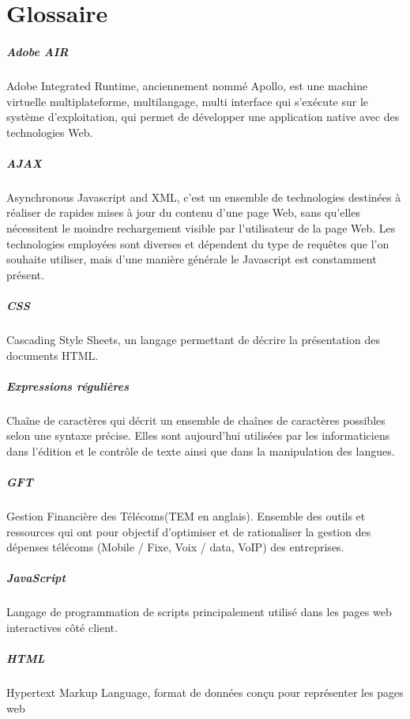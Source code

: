 \chapter{Glossaire}
\paragraph{Adobe AIR} Adobe Integrated Runtime, anciennement nommé Apollo, est une machine virtuelle multiplateforme, multilangage, multi interface qui s'exécute sur le système d'exploitation, qui permet de développer une application native avec des technologies Web.
\paragraph{AJAX}
Asynchronous Javascript and XML, c'est un ensemble de technologies destinées à réaliser de rapides mises à jour du contenu d'une page Web, sans qu'elles nécessitent le moindre rechargement visible par l'utilisateur de la page Web. Les technologies employées sont diverses et dépendent du type de requêtes que l'on souhaite utiliser, mais d'une manière générale le Javascript est constamment présent.
\paragraph{CSS} Cascading Style Sheets, un langage permettant de décrire la présentation des documents HTML.
\paragraph{Expressions régulières} Chaîne de caractères qui décrit un ensemble de chaînes de caractères possibles selon une syntaxe précise. Elles sont aujourd’hui utilisées par les informaticiens dans l’édition et le contrôle de texte ainsi que dans la manipulation des langues.
\paragraph{GFT} Gestion Financière des Télécoms(TEM en anglais). Ensemble des outils et ressources qui ont pour objectif d’optimiser et de rationaliser la gestion des dépenses télécoms (Mobile / Fixe, Voix / data, VoIP) des entreprises.
\paragraph{JavaScript} Langage de programmation de scripts principalement utilisé dans les pages web interactives côté client.
\paragraph{HTML} Hypertext Markup Language, format de données conçu pour représenter les
pages web
